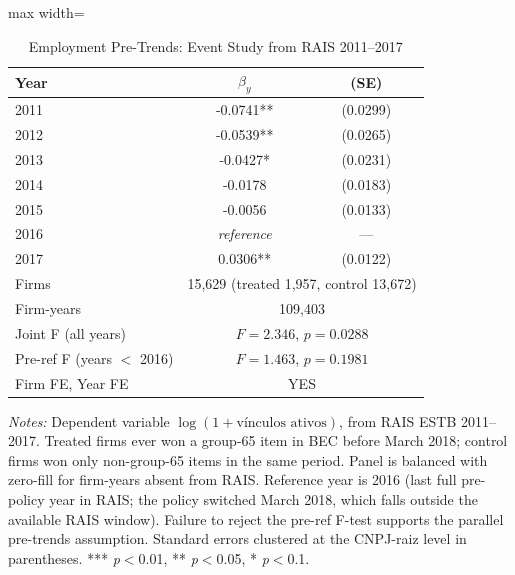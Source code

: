 \begin{table}[htbp]
\centering
\caption{Employment Pre-Trends: Event Study from RAIS 2011--2017}
\label{tab:pretrends}
\begin{adjustbox}{max width=\textwidth}
\begin{threeparttable}
\small
\begin{tabular}{lcc}
\toprule
 Year & $\beta_y$ & (SE) \\
\midrule
2011 & -0.0741** & (0.0299) \\
2012 & -0.0539** & (0.0265) \\
2013 & -0.0427* & (0.0231) \\
2014 & -0.0178 & (0.0183) \\
2015 & -0.0056 & (0.0133) \\
2016 & \textit{reference} & --- \\
2017 & 0.0306** & (0.0122) \\
\midrule
Firms & \multicolumn{2}{c}{15,629 (treated 1,957, control 13,672)} \\
Firm-years & \multicolumn{2}{c}{109,403} \\
Joint F (all years) & \multicolumn{2}{c}{$F = 2.346$, $p = 0.0288$} \\
Pre-ref F (years $<$ 2016) & \multicolumn{2}{c}{$F = 1.463$, $p = 0.1981$} \\
Firm FE, Year FE & \multicolumn{2}{c}{YES} \\
\bottomrule
\end{tabular}
\begin{tablenotes}
\small
\item \textit{Notes:} Dependent variable $\log(1 + \text{vínculos ativos})$,
from RAIS ESTB 2011--2017. Treated firms ever won a group-65 item in
BEC before March 2018; control firms won only non-group-65 items in the same period.
Panel is balanced with zero-fill for firm-years absent from RAIS.
Reference year is 2016 (last full pre-policy year in RAIS; the policy switched
March 2018, which falls outside the available RAIS window).
Failure to reject the pre-ref F-test supports the parallel pre-trends assumption.
Standard errors clustered at the CNPJ-raiz level in parentheses.
*** \textit{p}$<$0.01, ** \textit{p}$<$0.05, * \textit{p}$<$0.1.
\end{tablenotes}
\end{threeparttable}
\end{adjustbox}
\end{table}
